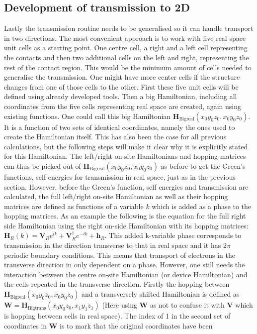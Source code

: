 \vspace{-1\baselineskip}
\vspace{\baselineskip}
\subsection{Development of transmission to 2D}\label{trans2d}
Lastly the transmission routine needs to be generalised so it can handle transport in two directions. The most convenient approach is to work with five real space unit cells as a starting point. One centre cell, a right and a left cell representing the contacts and then two additional cells on the left and right, representing the rest of the contact region. This would be the minimum amount of cells needed to generalise the transmission. One might have more center cells if the structure changes from one of those cells to the other. First these five unit cells will be defined using already developed tools. Then a big Hamiltonian, including all coordinates from the five cells representing real space are created, again using existing functions. One could call this big Hamiltonian \(\textbf{H}_{\text{Bigreal}}(x_0y_0z_0,x_0y_0z_0)\). It is a function of two sets of identical coordinates, namely the ones used to create the Hamiltonian itself. This has also been the case for all previous calculations, but the following steps will make it clear why it is explicitly stated for this Hamiltonian. The left/right on-site Hamiltonians and hopping matrices can thus be picked out of \(\textbf{H}_{\text{Bigreal}}(x_0y_0z_0,x_0y_0z_0)\) as before to get the Green's functions, self energies for transmission in real space, just as in the previous section. However, before the Green's function, self energies and transmission are calculated, the full left/right on-site Hamiltonian as well as their hopping matrices are defined as functions of a variable \(k\) which is added as a phase to the hopping matrices. As an example the following is the equation for the full right side Hamiltonian using the right on-side Hamiltonian with its hopping matrices: \(\textbf{H}_R(k) = \textbf{V}_Re^{ik}+\textbf{V}^{\dagger}_Re^{-ik}+\textbf{h}_R\). This added k-variable phase corresponds to transmission in the direction transverse to that in real space and it has \(2\pi\) periodic boundary conditions. This means that transport of electrons in the transverse direction in only dependent on a phase. However, one still needs the interaction between the centre on-site Hamiltonian (or device Hamiltonian) and the cells repeated in the transverse direction. Firstly the hopping between \(\textbf{H}_{\text{Bigreal}}(x_0y_0z_0,x_0y_0z_0)\) and a transversely shifted Hamiltonian is defined as \(\textbf{W} = \textbf{H}_{\text{Bigtrans}}(x_0y_0z_0,x_1y_1z_1)\) (Here using \textbf{W} as not to confuse it with \textbf{V} which is hopping between cells in real space). The  index of 1 in the second set of coordinates in \(\mathbf{W}\) is to mark that the original coordinates have been 